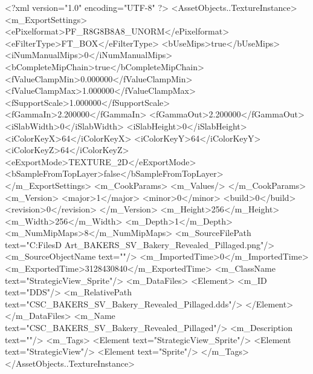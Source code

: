 <?xml version="1.0" encoding="UTF-8" ?>
<AssetObjects..TextureInstance>
	<m_ExportSettings>
		<ePixelformat>PF_R8G8B8A8_UNORM</ePixelformat>
		<eFilterType>FT_BOX</eFilterType>
		<bUseMips>true</bUseMips>
		<iNumManualMips>0</iNumManualMips>
		<bCompleteMipChain>true</bCompleteMipChain>
		<fValueClampMin>0.000000</fValueClampMin>
		<fValueClampMax>1.000000</fValueClampMax>
		<fSupportScale>1.000000</fSupportScale>
		<fGammaIn>2.200000</fGammaIn>
		<fGammaOut>2.200000</fGammaOut>
		<iSlabWidth>0</iSlabWidth>
		<iSlabHeight>0</iSlabHeight>
		<iColorKeyX>64</iColorKeyX>
		<iColorKeyY>64</iColorKeyY>
		<iColorKeyZ>64</iColorKeyZ>
		<eExportMode>TEXTURE_2D</eExportMode>
		<bSampleFromTopLayer>false</bSampleFromTopLayer>
	</m_ExportSettings>
	<m_CookParams>
		<m_Values/>
	</m_CookParams>
	<m_Version>
		<major>1</major>
		<minor>0</minor>
		<build>0</build>
		<revision>0</revision>
	</m_Version>
	<m_Height>256</m_Height>
	<m_Width>256</m_Width>
	<m_Depth>1</m_Depth>
	<m_NumMipMaps>8</m_NumMipMaps>
	<m_SourceFilePath text="C:\Users\Shadow\Desktop\Working Files\2D Art\Quarters\Bakers\StrategicView\CSC_BAKERS_SV_Bakery_Revealed_Pillaged.png"/>
	<m_SourceObjectName text=""/>
	<m_ImportedTime>0</m_ImportedTime>
	<m_ExportedTime>3128430840</m_ExportedTime>
	<m_ClassName text="StrategicView_Sprite"/>
	<m_DataFiles>
		<Element>
			<m_ID text="DDS"/>
			<m_RelativePath text="CSC_BAKERS_SV_Bakery_Revealed_Pillaged.dds"/>
		</Element>
	</m_DataFiles>
	<m_Name text="CSC_BAKERS_SV_Bakery_Revealed_Pillaged"/>
	<m_Description text=""/>
	<m_Tags>
		<Element text="StrategicView_Sprite"/>
		<Element text="StrategicView"/>
		<Element text="Sprite"/>
	</m_Tags>
</AssetObjects..TextureInstance>

